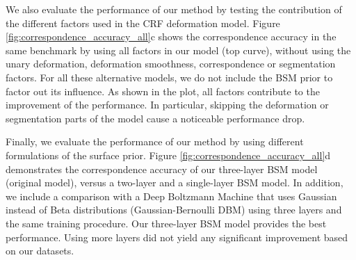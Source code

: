 We also evaluate the performance of our method by testing the contribution of the different factors used in the CRF deformation model. Figure \ref{fig:correspondence_accuracy_all}c shows the correspondence accuracy in the same benchmark by using all factors in our model (top curve), without using the unary deformation, deformation smoothness, correspondence or segmentation factors. For all these alternative models, we do not include the BSM prior to factor out its influence. As shown in the plot, all factors contribute to the improvement of the performance. In particular, skipping the deformation or segmentation parts of the model cause a noticeable performance drop. 

Finally, we evaluate the performance of our method by using different formulations of the surface prior. Figure \ref{fig:correspondence_accuracy_all}d demonstrates the correspondence accuracy of our three-layer BSM model (original model), versus a two-layer and a single-layer BSM model. In addition, we include a comparison with a Deep Boltzmann Machine that uses Gaussian instead of Beta distributions (Gaussian-Bernoulli DBM) using three layers and the same training procedure. Our three-layer BSM model provides the best performance. Using more layers did not yield any significant improvement based on our datasets.



